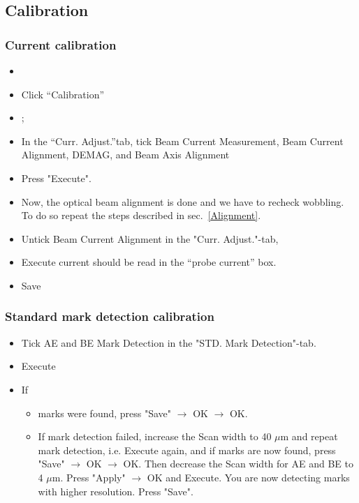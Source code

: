 \subsection{Calibration}

\subsubsection{Current calibration}
\label{sec:current-calibration}

\begin{itemize}
\item   {}
\item Click ``Calibration''
  \item {};
\item In  the ``Curr.  Adjust.''tab,  tick Beam  Current Measurement, Beam  Current Alignment,
  DEMAG, and Beam Axis Alignment %
\item Press "Execute".
\item Now,  the optical  beam alignment is  done and we  have to  recheck wobbling. To  do so
  repeat the steps described in sec.~\ref{Alignment}.
\end{itemize}

\begin{itemize}
\item   Untick    Beam   Current   Alignment    in   the
  "Curr. Adjust."-tab,
\item Execute \ira current should be read in the ``probe current'' box.
\item Save
\end{itemize}

\subsubsection{Standard mark detection calibration}
\label{sec:stand-mark-detect}

\begin{itemize}
\item Tick  AE and BE  Mark Detection in the  "STD. Mark
  Detection"-tab.
\item Execute
\item If
  \begin{itemize} \item  marks were found,  press "Save"
    $\rightarrow$ OK $\rightarrow$ OK.
  \item  If mark  detection  failed,  increase the  Scan
    width  to  40  $\mu$m  and  repeat  mark  detection,
    i.e.  Execute again,  and  if marks  are now  found,
    press "Save" $\rightarrow$ OK $\rightarrow$ OK. Then
    decrease  the  Scan  width  for   AE  and  BE  to  4
    $\mu$m.   Press   "Apply"   $\rightarrow$   OK   and
    Execute.  You are  now detecting  marks with  higher
    resolution. Press "Save".
  \end{itemize}
\end{itemize}

